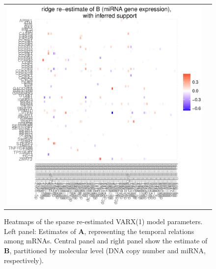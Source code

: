 \begin{figure}[h!]
\begin{tabular}{cc}
\includegraphics[scale=0.28]{Figure_16c.eps}
\end{tabular}
\caption{Heatmaps of the sparse re-estimated VARX(1) model parameters. Left panel: Estimates of $\mathbf{A}$, representing the temporal relations among mRNAs. Central panel and right panel show the estimate of $\mathbf{B}$, partitioned by molecular level (DNA copy number and miRNA, respectively).}
\label{fig:VARXestimatAandB}
\end{figure}



